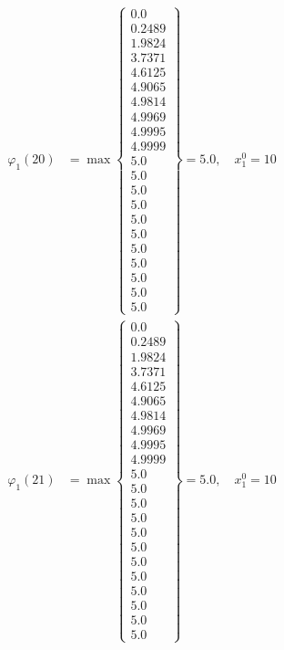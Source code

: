\documentclass{article}
\begin{document}
\begin{align*}
  
\varphi_{1}(20) &= \max \left\{ \begin{array}{c}
0.0 \\
 0.2489 \\
 1.9824 \\
 3.7371 \\
 4.6125 \\
 4.9065 \\
 4.9814 \\
 4.9969 \\
 4.9995 \\
 4.9999 \\
 5.0 \\
 5.0 \\
 5.0 \\
 5.0 \\
 5.0 \\
 5.0 \\
 5.0 \\
 5.0 \\
 5.0 \\
 5.0 \\
 5.0
\end{array} \right\}=5.0,\quad x_{1}^0=10\\
  
  
  
  
\varphi_{1}(21) &= \max \left\{ \begin{array}{c}
0.0 \\
 0.2489 \\
 1.9824 \\
 3.7371 \\
 4.6125 \\
 4.9065 \\
 4.9814 \\
 4.9969 \\
 4.9995 \\
 4.9999 \\
 5.0 \\
 5.0 \\
 5.0 \\
 5.0 \\
 5.0 \\
 5.0 \\
 5.0 \\
 5.0 \\
 5.0 \\
 5.0 \\
 5.0 \\
 5.0
\end{array} \right\}=5.0,\quad x_{1}^0=10\\
  
  
  

\end{align*}
\end{document}
